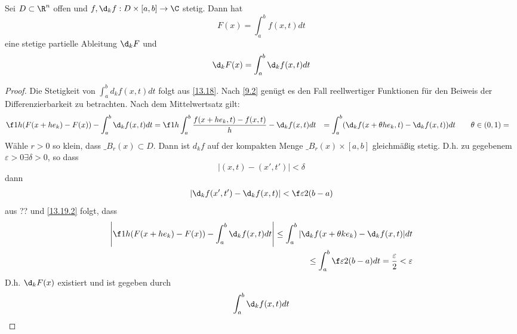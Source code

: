 \documentclass[a4paper,10pt]{scrartcl}
\begin{document}
\begin{st}
\label{13.19}
Sei $D\subset \R^n$ offen und $f,\d_k f: D\times [a,b]\to \C$ stetig.
Dann hat
\[
F(x) = \int_a^bf(x,t)dt
\]
eine stetige partielle Ableitung $\d_k F$ und
\[
\d_k F(x) = \int_a^b\d_kf(x,t)dt
\]

\begin{proof}
Die Stetigkeit von $\int_a^bd_k f(x,t)dt$ folgt aus \ref{13.18}.
Nach \ref{9.2} genügt es den Fall reellwertiger Funktionen für den Beiweis der Differenzierbarkeit zu betrachten.
Nach dem Mittelwertsatz gilt:
\begin{align*}
\f 1h (F(x+he_k)-F(x)) - \int_a^b \d_kf(x,t)dt
&= \f 1h \int_a^b \frac {f(x+he_k,t)-f(x,t)}h - \d_k f(x,t) dt
&= \int_a^b (\d_k f(x+\theta he_k, t) -\d_kf(x,t))dt \qquad \theta \in (0,1)
&= 
\end{align*}
Wähle $r>0$ so klein, dass $\_{B_r(x)}\subset D$.
Dann ist $d_k f$ auf der kompakten Menge $\_{B_r(x)} \times [a,b]$ gleichmäßig stetig.
D.h. zu gegebenem $\varepsilon > 0 \exists \delta > 0$, so dass 
\[
|(x,t)-(x',t')|<\delta
\]
dann
\begin{align*}
\label{13.19.2}
|\d_kf(x',t')-\d_kf(x,t)| < \f \varepsilon{2(b-a)}
\end{align*}
aus ?? und \eqref{13.19.2} folgt, dass
\begin{align*}
\left| \f 1h(F(x+he_k)-F(x)) - \int_a^b\d_kf(x,t)dt\right|
\le \int_a^b|\d_kf(x+\theta k e_k)-\d_kf(x,t)|dt\\
\le \int_a^b \f\varepsilon {2(b-a)}dt = \frac \varepsilon 2 < \varepsilon
\end{align*}
D.h. $\d_k F(x) $ existiert und ist gegeben durch
\[
\int_a^b\d_kf(x,t)dt
\]
\end{proof}
\end{st}
\end{document}
